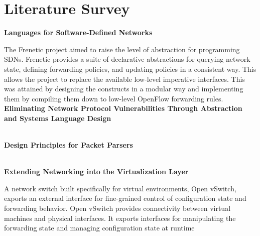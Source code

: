 
\section{Literature Survey}

\textbf{Languages for Software-Defined Networks} 

The Frenetic project aimed to raise the level of abstraction for 
programming SDNs. Frenetic provides a suite of declarative abstractions 
for querying network state, defining forwarding policies, and updating 
policies in a consistent way. This allows the project to replace the 
available low-level imperative interfaces. This was attained by designing 
the constructs in a modular way and implementing them by compiling
them down to low-level OpenFlow forwarding rules. \cite{Foster2013} \\

\noindent \textbf{Eliminating Network Protocol Vulnerabilities Through Abstraction and Systems Language Design
}





\cite{Casey2013} \\

\noindent \textbf{Design Principles for Packet Parsers}


\cite{Gibb2013} \\

\noindent \textbf{Extending Networking into the Virtualization Layer}

A network switch built specifically for virtual environments, Open vSwitch, exports an external interface
for fine-grained control of configuration state and forwarding behavior. Open vSwitch provides
connectivity between virtual machines and physical interfaces. It exports interfaces for manipulating
the forwarding state and managing configuration state at runtime  
\cite{Pfaff2009} \\

